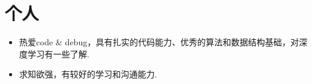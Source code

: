 \documentclass[letterpaper,11pt]{article}
\newcommand{\resumeSubHeadingListStart}{\begin{itemize}[leftmargin=*]}
\newcommand{\resumeSubHeadingListEnd}{\end{itemize}}
\begin{document}
\vspace{-10pt}
\section{个人}
 \resumeSubHeadingListStart
   \item{
     {热爱code \& debug，具有扎实的代码能力、优秀的算法和数据结构基础，对深度学习有一些了解.}
   }
   \item{
    求知欲强，有较好的学习和沟通能力.
   }   
 \resumeSubHeadingListEnd


\end{document}
